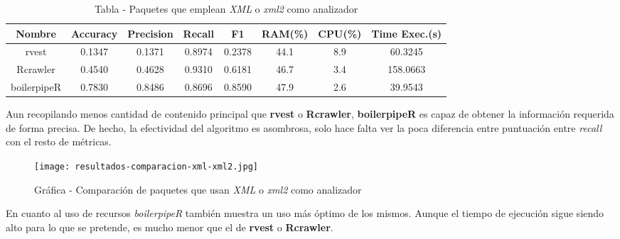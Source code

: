 \begin{table}[h]
    \begin{center}
      \begin{tabular}{| c | c | c | c | c | c | c | c |} \hline 
       \textbf{Nombre} & \textbf{Accuracy} & \textbf{Precision}  & \textbf{Recall} & \textbf{F1} & \textbf{RAM(\%)} & \textbf{CPU(\%)} & \textbf{Time Exec.(s)} \\ \hline
       rvest & 0.1347 & 0.1371 & 0.8974 & 0.2378 & 44.1 & 8.9 & 60.3245 \\ \hline
       Rcrawler & 0.4540 & 0.4628 & 0.9310 & 0.6181 & 46.7 & 3.4 & 158.0663 \\ \hline
       boilerpipeR & 0.7830 & 0.8486 & 0.8696 & 0.8590 & 47.9 & 2.6 & 39.9543 \\ \hline
      \end{tabular}
      \caption{Tabla - Paquetes que emplean \emph{XML} o \emph{xml2} como analizador}
      \label{tab:tabla - paquetes que emplean xml o xml2 como analizador}
    \end{center}
\end{table}

Aun recopilando menos cantidad de contenido principal que \textbf{rvest} o \textbf{Rcrawler}, 
\textbf{boilerpipeR} es capaz de obtener la información requerida de forma precisa. De hecho, la efectividad 
del algoritmo es asombrosa, solo hace falta ver la poca diferencia entre puntuación entre \emph{recall} 
con el resto de métricas.

\begin{figure}[tphb]
    \centering
    \texttt{[image: resultados-comparacion-xml-xml2.jpg]}
    \caption{Gráfica - Comparación de paquetes que usan \emph{XML} o \emph{xml2} como analizador}
    \label{img:grafica - comparacion de paquetes que usan xml o xml2 como analizador}
\end{figure}

En cuanto al uso de recursos \emph{boilerpipeR} también muestra un uso más óptimo de los mismos. Aunque el
tiempo de ejecución sigue siendo alto para lo que se pretende, es mucho menor que el de \textbf{rvest} o
\textbf{Rcrawler}.


 